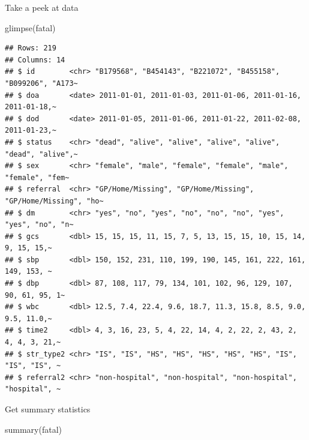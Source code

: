 \documentclass[
]{book}
\makeatletter
\newenvironment{Shaded}{\begin{snugshade}}{\end{snugshade}}
\newcommand{\FunctionTok}[1]{\textcolor[rgb]{0,0,0}{#1}}
\newcommand{\NormalTok}[1]{#1}
\newenvironment{kframe}{%
\medskip{}
\setlength{\fboxsep}{.8em}
 \def\at@end@of@kframe{}%
 \ifinner\ifhmode%
  \def\at@end@of@kframe{\end{minipage}}%
  \begin{minipage}{\columnwidth}%
 \fi\fi%
 \def\FrameCommand##1{\hskip\@totalleftmargin \hskip-\fboxsep
 \colorbox{shadecolor}{##1}\hskip-\fboxsep
     \hskip-\linewidth \hskip-\@totalleftmargin \hskip\columnwidth}%
 \MakeFramed {\advance\hsize-\width
   \@totalleftmargin\z@ \linewidth\hsize
   \@setminipage}}%
 {\par\unskip\endMakeFramed%
 \at@end@of@kframe}
\renewenvironment{Shaded}{\begin{kframe}}{\end{kframe}}
\makeatother
\begin{document}
Take a peek at data

\begin{Shaded}
\begin{Highlighting}[]
\FunctionTok{glimpse}\NormalTok{(fatal)}
\end{Highlighting}
\end{Shaded}

\begin{verbatim}
## Rows: 219
## Columns: 14
## $ id        <chr> "B179568", "B454143", "B221072", "B455158", "B099206", "A173~
## $ doa       <date> 2011-01-01, 2011-01-03, 2011-01-06, 2011-01-16, 2011-01-18,~
## $ dod       <date> 2011-01-05, 2011-01-06, 2011-01-22, 2011-02-08, 2011-01-23,~
## $ status    <chr> "dead", "alive", "alive", "alive", "alive", "dead", "alive",~
## $ sex       <chr> "female", "male", "female", "female", "male", "female", "fem~
## $ referral  <chr> "GP/Home/Missing", "GP/Home/Missing", "GP/Home/Missing", "ho~
## $ dm        <chr> "yes", "no", "yes", "no", "no", "no", "yes", "yes", "no", "n~
## $ gcs       <dbl> 15, 15, 15, 11, 15, 7, 5, 13, 15, 15, 10, 15, 14, 9, 15, 15,~
## $ sbp       <dbl> 150, 152, 231, 110, 199, 190, 145, 161, 222, 161, 149, 153, ~
## $ dbp       <dbl> 87, 108, 117, 79, 134, 101, 102, 96, 129, 107, 90, 61, 95, 1~
## $ wbc       <dbl> 12.5, 7.4, 22.4, 9.6, 18.7, 11.3, 15.8, 8.5, 9.0, 9.5, 11.0,~
## $ time2     <dbl> 4, 3, 16, 23, 5, 4, 22, 14, 4, 2, 22, 2, 43, 2, 4, 4, 3, 21,~
## $ str_type2 <chr> "IS", "IS", "HS", "HS", "HS", "HS", "HS", "IS", "IS", "IS", ~
## $ referral2 <chr> "non-hospital", "non-hospital", "non-hospital", "hospital", ~
\end{verbatim}

Get summary statistics

\begin{Shaded}
\begin{Highlighting}[]
\FunctionTok{summary}\NormalTok{(fatal)}
\end{Highlighting}
\end{Shaded}
\end{document}
